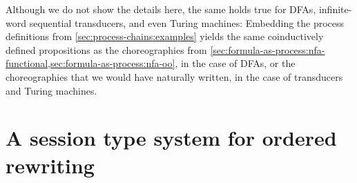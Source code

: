 Although we do not show the details here, the same holds true for \acp{DFA}, infinite-word sequential transducers, and even Turing machines:
Embedding the process definitions from \cref{sec:process-chains:examples} yields the same coinductively defined propositions as the choreographies from \cref{sec:formula-as-process:nfa-functional,sec:formula-as-process:nfa-oo}, in the case of \acp{DFA}, or the choreographies that we would have naturally written, in the case of transducers and Turing machines.






\section{A session type system for ordered rewriting}\label{sec:correspond:types}

